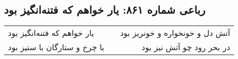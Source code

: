 \begin{center}
\section*{رباعی شماره ۸۶۱: یار خواهم که فتنه‌انگیز بود}
\label{sec:0861}
\begin{longtable}{l p{0.5cm} r}
یار خواهم که فتنه‌انگیز بود
&&
آتش دل و خونخواره و خونریز بود
\\
با چرخ و ستارگان با ستیز بود
&&
در بحر رود چو آتش نیز بود
\\
\end{longtable}
\end{center}
